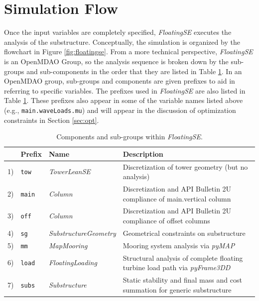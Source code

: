 \section{Simulation Flow}
Once the input variables are completely specified, \textit{FloatingSE}
executes the analysis of the substructure.  Conceptually, the simulation
is organized by the flowchart in Figure \ref{fig:floatingse}.  From a
more technical perspective, \textit{FloatingSE} is an OpenMDAO Group, so
the analysis sequence is broken down by the sub-groups and
sub-components in the order that they are listed in Table
\ref{tbl:exec}.  In an OpenMDAO group, sub-groups and components are
given prefixes to aid in referring to specific variables.  The prefixes
used in \textit{FloatingSE} are also listed in Table \ref{tbl:exec}.
These prefixes also appear in some of the variable names listed above (e.g.,
\texttt{main.waveLoads.mu}) and will appear in the discussion of
optimization constraints in Section \ref{sec:opt}.

\begin{table}[htbp] \begin{center}
    \caption{Components and sub-groups within \textit{FloatingSE}.}
    \label{tbl:exec}
{\small
  \begin{tabular}{ l l l l } \hline
    &  \textbf{Prefix} & \textbf{Name} & \textbf{Description} \\ \hline\hline
    1) & \texttt{tow} & \textit{TowerLeanSE} & Discretization of tower
    geometry (but no analysis) \\
    2) & \texttt{main} & \textit{Column} & Discretization and API
    Bulletin 2U compliance of main.vertical column \\
    3) & \texttt{off} & \textit{Column} & Discretization and API
    Bulletin 2U compliance of offset columns \\
    4) & \texttt{sg} & \textit{SubstructureGeometry} & Geometrical constraints
    on substructure \\
    5) & \texttt{mm} & \textit{MapMooring} & Mooring system analysis via \textit{pyMAP} \\
    6) & \texttt{load} & \textit{FloatingLoading} & Structural analysis
    of complete floating turbine load path via \textit{pyFrame3DD} \\
    7) & \texttt{subs} & \textit{Substructure} & Static stability and final mass and cost summation for generic substructure \\
  \hline \end{tabular}
}
\end{center} \end{table}

